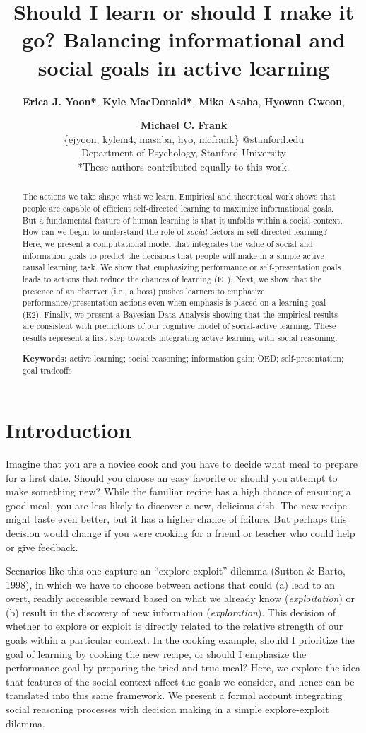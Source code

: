 \documentclass[10pt, letterpaper]{article}
\title{Should I learn or should I make it go? Balancing informational and
social goals in active learning}
\author{{\large \bf Erica J. Yoon*}, {\large \bf Kyle MacDonald*}, {\large \bf Mika Asaba}, {\large \bf Hyowon Gweon}, \and {\large \bf Michael C. Frank} \\ \{ejyoon, kylem4, masaba, hyo, mcfrank\} @stanford.edu \\ Department of Psychology, Stanford University \\ *These authors contributed equally to this work.}
\begin{document}
\maketitle

\begin{abstract}
The actions we take shape what we learn. Empirical and theoretical work
shows that people are capable of efficient self-directed learning to
maximize informational goals. But a fundamental feature of human
learning is that it unfolds within a social context. How can we begin to
understand the role of \emph{social} factors in self-directed learning?
Here, we present a computational model that integrates the value of
social and information goals to predict the decisions that people will
make in a simple active causal learning task. We show that emphasizing
performance or self-presentation goals leads to actions that reduce the
chances of learning (E1). Next, we show that the presence of an observer
(i.e., a boss) pushes learners to emphasize performance/presentation
actions even when emphasis is placed on a learning goal (E2). Finally,
we present a Bayesian Data Analysis showing that the empirical results
are consistent with predictions of our cognitive model of social-active
learning. These results represent a first step towards integrating
active learning with social reasoning.

\textbf{Keywords:}
active learning; social reasoning; information gain; OED;
self-presentation; goal tradeoffs
\end{abstract}

\section{Introduction}\label{introduction}

Imagine that you are a novice cook and you have to decide what meal to
prepare for a first date. Should you choose an easy favorite or should
you attempt to make something new? While the familiar recipe has a high
chance of ensuring a good meal, you are less likely to discover a new,
delicious dish. The new recipe might taste even better, but it has a
higher chance of failure. But perhaps this decision would change if you
were cooking for a friend or teacher who could help or give feedback.

Scenarios like this one capture an ``explore-exploit'' dilemma (Sutton
\& Barto, 1998), in which we have to choose between actions that could
(a) lead to an overt, readily accessible reward based on what we already
know (\emph{exploitation}) or (b) result in the discovery of new
information (\emph{exploration}). This decision of whether to explore or
exploit is directly related to the relative strength of our goals within
a particular context. In the cooking example, should I prioritize the
goal of learning by cooking the new recipe, or should I emphasize the
performance goal by preparing the tried and true meal? Here, we explore
the idea that features of the social context affect the goals we
consider, and hence can be translated into this same framework. We
present a formal account integrating social reasoning processes with
decision making in a simple explore-exploit dilemma.
\end{document}
